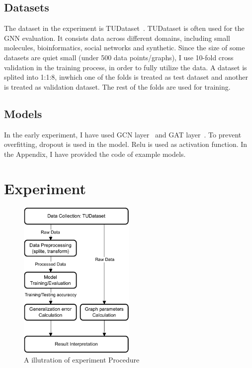 \documentclass{article}
\begin{document}
\subsection{Datasets}
The dataset in the experiment is TUDataset~\cite{morris_tudataset_2020}. TUDataset is often used for the GNN evaluation. It consists data across different domains, including small molecules, bioinformatics, social networks and synthetic. Since the size of some datasets are quiet small (under 500 data points/graphs), I use 10-fold cross validation in the training process, in order to fully utilize the data. A dataset is splited into 1:1:8, inwhich one of the folds is treated as test dataset and another is treated as validation dataset. The rest of the folds are used for training. 

\subsection{Models}
In the early experiment, I have used GCN layer~\cite{kipf2017semisupervised} and GAT layer~\cite{velickovic2020pointer}. To prevent overfitting, dropout is used in the model. Relu is used as activation function. In the Appendix, I have provided the code of example models.


\section{Experiment}


\begin{figure}[h]
    \centering
    \includegraphics[width=0.5\textwidth]{experiment_procedure.pdf}
    \caption{A illutration of experiment Procedure}
    \label{fig:experiment}
\end{figure}
\end{document}
